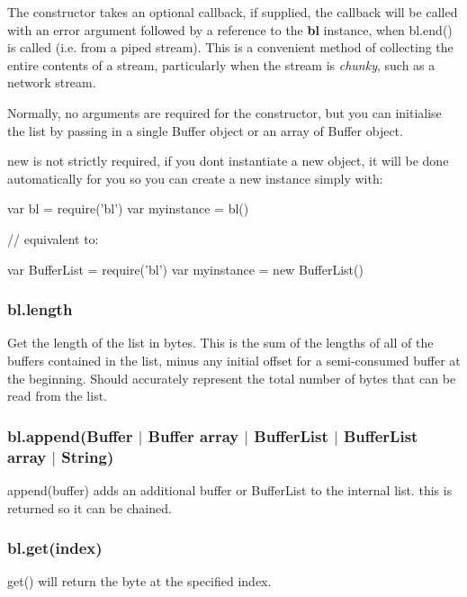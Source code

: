 The constructor takes an optional callback, if supplied, the callback will be called with an error argument followed by a reference to the {\bfseries bl} instance, when {\ttfamily bl.\+end()} is called (i.\+e. from a piped stream). This is a convenient method of collecting the entire contents of a stream, particularly when the stream is {\itshape chunky}, such as a network stream.

Normally, no arguments are required for the constructor, but you can initialise the list by passing in a single {\ttfamily Buffer} object or an array of {\ttfamily Buffer} object.

{\ttfamily new} is not strictly required, if you don\textquotesingle{}t instantiate a new object, it will be done automatically for you so you can create a new instance simply with\+:


\begin{DoxyCode}
var bl = require('bl')
var myinstance = bl()

// equivalent to:

var BufferList = require('bl')
var myinstance = new BufferList()
\end{DoxyCode}
 

 \label{_length}%
 \subsubsection*{bl.\+length}

Get the length of the list in bytes. This is the sum of the lengths of all of the buffers contained in the list, minus any initial offset for a semi-\/consumed buffer at the beginning. Should accurately represent the total number of bytes that can be read from the list. 

 \label{_append}%
 \subsubsection*{bl.\+append(Buffer $\vert$ Buffer array $\vert$ Buffer\+List $\vert$ Buffer\+List array $\vert$ String)}

{\ttfamily append(buffer)} adds an additional buffer or Buffer\+List to the internal list. {\ttfamily this} is returned so it can be chained. 

 \label{_get}%
 \subsubsection*{bl.\+get(index)}

{\ttfamily get()} will return the byte at the specified index. 

